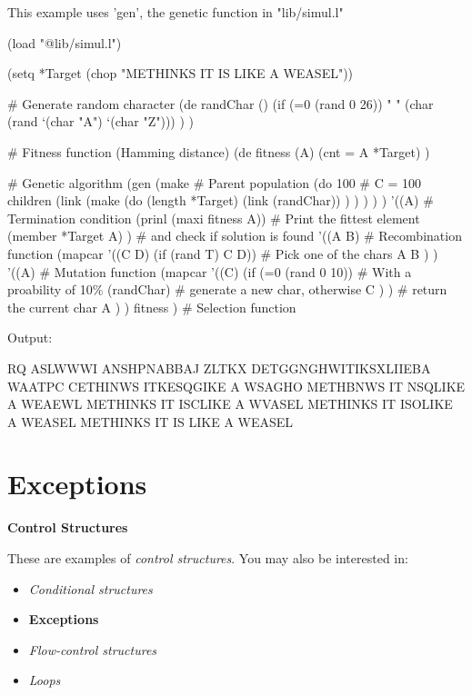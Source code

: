 \begin{wideverbatim}
This example uses 'gen', the genetic function in "lib/simul.l"

(load "@lib/simul.l")

(setq *Target (chop "METHINKS IT IS LIKE A WEASEL"))

# Generate random character
(de randChar ()
   (if (=0 (rand 0 26))
      " "
      (char (rand `(char "A") `(char "Z"))) ) )

# Fitness function (Hamming distance)
(de fitness (A)
   (cnt = A *Target) )

# Genetic algorithm
(gen
   (make                               # Parent population
      (do 100                             # C = 100 children
         (link
            (make
               (do (length *Target)
                  (link (randChar)) ) ) ) ) )
   '((A)                               # Termination condition
      (prinl (maxi fitness A))            # Print the fittest element
      (member *Target A) )                # and check if solution is found
   '((A B)                             # Recombination function
      (mapcar
         '((C D) (if (rand T) C D))       # Pick one of the chars
         A B ) )
   '((A)                               # Mutation function
      (mapcar
         '((C)
            (if (=0 (rand 0 10))          # With a proability of 10\%
               (randChar)                 # generate a new char, otherwise
               C ) )                      # return the current char
         A ) )
   fitness )                           # Selection function

Output:

RQ ASLWWWI ANSHPNABBAJ ZLTKX
DETGGNGHWITIKSXLIIEBA WAATPC
CETHINWS ITKESQGIKE A WSAGHO
METHBNWS IT NSQLIKE A WEAEWL
METHINKS IT ISCLIKE A WVASEL
METHINKS IT ISOLIKE A WEASEL
METHINKS IT IS LIKE A WEASEL

\end{wideverbatim}

\pagebreak{}
\section*{Exceptions}

\textbf{Control Structures}

These are examples of \emph{control structures}. You may also be
interested in:

\begin{itemize}
\item
  \emph{Conditional structures}
\item
  \textbf{Exceptions}
\item
  \emph{Flow-control structures}
\item
  \emph{Loops}
\end{itemize}

